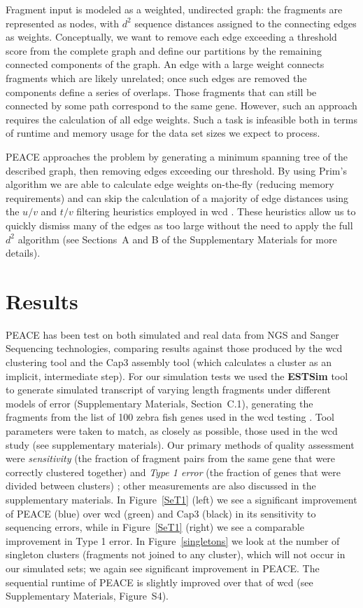 \documentclass[a4,center,fleqn]{NAR}
\newcommand{\peace} {{\small PEACE}}
\begin{document}
Fragment input is modeled as a weighted, undirected graph: the fragments
are represented as nodes, with $d^2$ sequence distances assigned to
the connecting edges as weights.  Conceptually, we want to remove each
edge exceeding a threshold score from the complete graph and define
our partitions by the remaining connected components of the graph.  An
edge with a large weight connects fragments which are likely unrelated;
once such edges are removed the components define a series of
overlaps.  Those fragments that can still be connected by some path
correspond to the same gene.  However, such an approach requires the
calculation of all edge weights.  Such a task is infeasible both in terms of
runtime and memory usage for the data set sizes we expect to process.

\peace\/ approaches the problem by generating a minimum spanning tree of the
described graph, then removing edges exceeding our threshold.  By
using Prim's algorithm we are able to calculate edge weights
on-the-fly (reducing memory requirements) and can skip the
calculation of a majority of edge distances using the $u/v$ and $t/v$
filtering heuristics employed in {\sc wcd} \cite{Hazelhurst08a}.
These heuristics allow us to quickly dismiss many of the edges as too
large without the need to apply the full $d^2$ algorithm (see
Sections~A and B of the Supplementary Materials for more details). 

\section{Results}

\peace\/ has been test on both simulated and real data from NGS and
Sanger Sequencing technologies, comparing results against those
produced by the {\sc wcd} clustering tool \cite{Hazelhurst08a} and the
{\sc Cap3} assembly tool \cite{Huang99} (which calculates a cluster as
an implicit, intermediate step).  For our simulation tests we used the
{\bf ESTSim} tool \cite{Hazelhurst03} to generate simulated transcript
of varying length fragments under different models of error
(Supplementary Materials, Section~C.1), generating the fragments from
the list of 100 zebra fish genes used in the {\sc wcd} testing
\cite{Hazelhurst08a}.  Tool parameters were taken to match, as closely
as possible, those used in the {\sc wcd} study (see supplementary
materials).  Our primary methods of quality assessment were {\it
  sensitivity} (the fraction of fragment pairs from the same gene that
were correctly clustered together) and {\it Type 1 error} (the
fraction of genes that were divided between clusters)
\cite{Wang04,Hazelhurst08a}; other measurements are also discussed in
the supplementary materials.  In Figure~\ref{SeT1} (left) we see a
significant improvement of \peace\/ (blue) over {\sc wcd} (green) and
{\sc Cap3} (black) in its sensitivity to sequencing errors, while in
Figure~\ref{SeT1} (right) we see a comparable improvement in Type 1
error.  In Figure~\ref{singletons} we look at the number of singleton
clusters (fragments not joined to any cluster), which will not occur
in our simulated sets; we again see significant improvement in \peace.
The sequential runtime of \peace\/ is slightly improved over that of
{\sc wcd} (see Supplementary Materials, Figure~S4).
\end{document}
